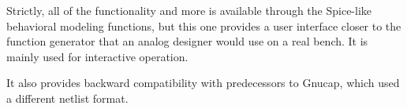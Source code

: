 Strictly, all of the functionality and more is available through the
Spice-like behavioral modeling functions, but this one provides a user 
interface closer to the function generator that an analog designer
would use on a real bench.  It is mainly used for interactive operation.

It also provides backward compatibility with predecessors to Gnucap,
which used a different netlist format.
